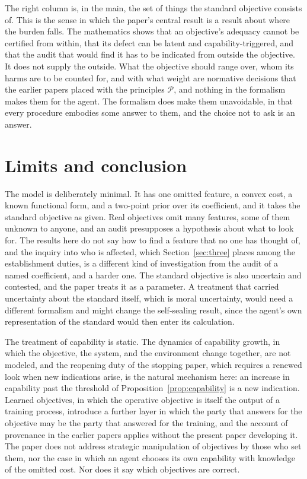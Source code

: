 \documentclass[11pt]{article}
\theoremstyle{plain}
\theoremstyle{definition}
\begin{document}
The right column is, in the main, the set of things the standard objective consists of. This is the sense in which the paper's central result is a result about where the burden falls. The mathematics shows that an objective's adequacy cannot be certified from within, that its defect can be latent and capability-triggered, and that the audit that would find it has to be indicated from outside the objective. It does not supply the outside. What the objective should range over, whom its harms are to be counted for, and with what weight are normative decisions that the earlier papers placed with the principles $\mathcal P$, and nothing in the formalism makes them for the agent. The formalism does make them unavoidable, in that every procedure embodies some answer to them, and the choice not to ask is an answer.

\section{Limits and conclusion}\label{sec:limits}

The model is deliberately minimal. It has one omitted feature, a convex cost, a known functional form, and a two-point prior over its coefficient, and it takes the standard objective as given. Real objectives omit many features, some of them unknown to anyone, and an audit presupposes a hypothesis about what to look for. The results here do not say how to find a feature that no one has thought of, and the inquiry into who is affected, which Section~\ref{sec:three} places among the establishment duties, is a different kind of investigation from the audit of a named coefficient, and a harder one. The standard objective is also uncertain and contested, and the paper treats it as a parameter. A treatment that carried uncertainty about the standard itself, which is moral uncertainty, would need a different formalism and might change the self-sealing result, since the agent's own representation of the standard would then enter its calculation.

The treatment of capability is static. The dynamics of capability growth, in which the objective, the system, and the environment change together, are not modeled, and the reopening duty of the stopping paper, which requires a renewed look when new indications arise, is the natural mechanism here: an increase in capability past the threshold of Proposition~\ref{prop:capability} is a new indication. Learned objectives, in which the operative objective is itself the output of a training process, introduce a further layer in which the party that answers for the objective may be the party that answered for the training, and the account of provenance in the earlier papers applies without the present paper developing it. The paper does not address strategic manipulation of objectives by those who set them, nor the case in which an agent chooses its own capability with knowledge of the omitted cost. Nor does it say which objectives are correct.
\end{document}
